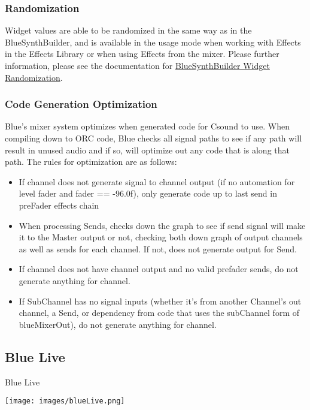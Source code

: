 \subsubsection{Randomization}

Widget values are able to be randomized in the same way as in the
BlueSynthBuilder, and is available in the usage mode when working with
Effects in the Effects Library or when using Effects from the mixer.
Please further information, please see the documentation for
\protect\hyperlink{bsbWidgetRandomization}{BlueSynthBuilder Widget
Randomization}.

\subsubsection{Code Generation Optimization}

Blue's mixer system optimizes when generated code for Csound to use.
When compiling down to ORC code, Blue checks all signal paths to see if
any path will result in unused audio and if so, will optimize out any
code that is along that path. The rules for optimization are as follows:

\begin{itemize}
\item
  If channel does not generate signal to channel output (if no
  automation for level fader and fader == -96.0f), only generate code up
  to last send in preFader effects chain
\item
  When processing Sends, checks down the graph to see if send signal
  will make it to the Master output or not, checking both down graph of
  output channels as well as sends for each channel. If not, does not
  generate output for Send.
\item
  If channel does not have channel output and no valid prefader sends,
  do not generate anything for channel.
\item
  If SubChannel has no signal inputs (whether it's from another
  Channel's out channel, a Send, or dependency from code that uses the
  subChannel form of blueMixerOut), do not generate anything for
  channel.
\end{itemize}

\subsection{Blue Live}\label{blueLive}

Blue Live

\texttt{[image: images/blueLive.png]}

